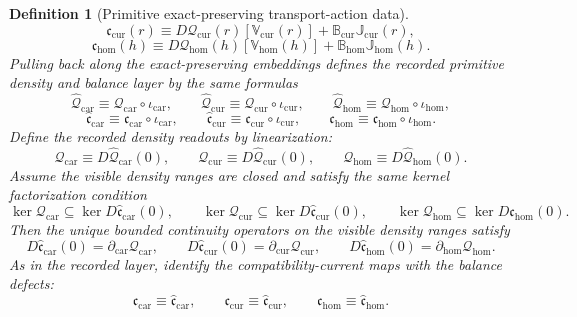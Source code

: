 \documentclass[11pt]{article}
\newcommand{\TensorCurrent}{\mathfrak c_{\mathrm{car}}}
\newcommand{\CurCurrent}{\mathfrak c_{\mathrm{cur}}}
\newcommand{\HomCurrent}{\mathfrak c_{\mathrm{hom}}}
\newcommand{\TensorDensity}{\mathcal Q_{\mathrm{car}}}
\newcommand{\CurDensity}{\mathcal Q_{\mathrm{cur}}}
\newcommand{\HomDensity}{\mathcal Q_{\mathrm{hom}}}
\newcommand{\TensorCont}{\partial_{\mathrm{car}}}
\newcommand{\CurCont}{\partial_{\mathrm{cur}}}
\newcommand{\HomCont}{\partial_{\mathrm{hom}}}
\newcommand{\TensorPrimitiveDensity}{\widehat{\mathcal Q}_{\mathrm{car}}}
\newcommand{\CurPrimitiveDensity}{\widehat{\mathcal Q}_{\mathrm{cur}}}
\newcommand{\HomPrimitiveDensity}{\widehat{\mathcal Q}_{\mathrm{hom}}}
\newcommand{\TensorBalance}{\widehat{\mathfrak c}_{\mathrm{car}}}
\newcommand{\CurBalance}{\widehat{\mathfrak c}_{\mathrm{cur}}}
\newcommand{\HomBalance}{\widehat{\mathfrak c}_{\mathrm{hom}}}
\newcommand{\TensorStateEmbed}{\iota_{\mathrm{car}}}
\newcommand{\CurStateEmbed}{\iota_{\mathrm{cur}}}
\newcommand{\HomStateEmbed}{\iota_{\mathrm{hom}}}
\newcommand{\TensorRawDensity}{\boldsymbol{\mathcal Q}_{\mathrm{car}}}
\newcommand{\CurRawDensity}{\boldsymbol{\mathcal Q}_{\mathrm{cur}}}
\newcommand{\HomRawDensity}{\boldsymbol{\mathcal Q}_{\mathrm{hom}}}
\newcommand{\CurTransport}{\mathbb V_{\mathrm{cur}}}
\newcommand{\HomTransport}{\mathbb V_{\mathrm{hom}}}
\newcommand{\CurFlux}{\mathbb J_{\mathrm{cur}}}
\newcommand{\HomFlux}{\mathbb J_{\mathrm{hom}}}
\newcommand{\CurDiv}{\mathbb B_{\mathrm{cur}}}
\newcommand{\HomDiv}{\mathbb B_{\mathrm{hom}}}
\newcommand{\TensorRawBalance}{\boldsymbol{\mathfrak c}_{\mathrm{car}}}
\newcommand{\CurRawBalance}{\boldsymbol{\mathfrak c}_{\mathrm{cur}}}
\newcommand{\HomRawBalance}{\boldsymbol{\mathfrak c}_{\mathrm{hom}}}
\newtheorem{definition}{Definition}
\begin{document}
\begin{definition}[Primitive exact-preserving transport-action data]
\begin{equation}
\CurRawBalance(r)
\equiv
D\CurRawDensity(r)[\CurTransport(r)]
+\CurDiv\CurFlux(r),
\label{eq:action_raw_balance_cur}
\end{equation}
\begin{equation}
\HomRawBalance(h)
\equiv
D\HomRawDensity(h)[\HomTransport(h)]
+\HomDiv\HomFlux(h).
\label{eq:action_raw_balance_hom}
\end{equation}
Pulling back along the exact-preserving embeddings defines the recorded primitive density and balance layer by the same formulas
\begin{equation}
\TensorPrimitiveDensity\equiv\TensorRawDensity\circ\TensorStateEmbed,\qquad
\CurPrimitiveDensity\equiv\CurRawDensity\circ\CurStateEmbed,\qquad
\HomPrimitiveDensity\equiv\HomRawDensity\circ\HomStateEmbed,
\label{eq:primitive_density_from_action}
\end{equation}
\begin{equation}
\TensorBalance\equiv\TensorRawBalance\circ\TensorStateEmbed,\qquad
\CurBalance\equiv\CurRawBalance\circ\CurStateEmbed,\qquad
\HomBalance\equiv\HomRawBalance\circ\HomStateEmbed.
\label{eq:primitive_balance_from_action}
\end{equation}
Define the recorded density readouts by linearization:
\begin{equation}
\TensorDensity\equiv D\TensorPrimitiveDensity(0),\qquad
\CurDensity\equiv D\CurPrimitiveDensity(0),\qquad
\HomDensity\equiv D\HomPrimitiveDensity(0).
\label{eq:density_from_action}
\end{equation}
Assume the visible density ranges are closed and satisfy the same kernel factorization condition
\begin{equation}
\ker\TensorDensity\subseteq\ker D\TensorBalance(0),\qquad
\ker\CurDensity\subseteq\ker D\CurBalance(0),\qquad
\ker\HomDensity\subseteq\ker D\HomBalance(0).
\label{eq:action_kernel_factor}
\end{equation}
Then the unique bounded continuity operators on the visible density ranges satisfy
\begin{equation}
D\TensorBalance(0)=\TensorCont\TensorDensity,\qquad
D\CurBalance(0)=\CurCont\CurDensity,\qquad
D\HomBalance(0)=\HomCont\HomDensity.
\label{eq:action_cont_factor}
\end{equation}
As in the recorded layer, identify the compatibility-current maps with the balance defects:
\begin{equation}
\TensorCurrent\equiv\TensorBalance,\qquad
\CurCurrent\equiv\CurBalance,\qquad
\HomCurrent\equiv\HomBalance.
\label{eq:action_currents}
\end{equation}
\end{definition}
\end{document}
